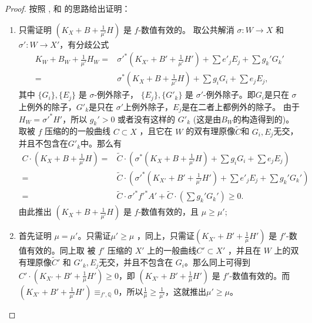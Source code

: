 \begin{proof}
  按照 \citet[Claim 13.20]{haconMinimalModelProgram2012}, \citet[Theorem 5.1]{liuSarkisovProgramGeneralized2021} 和 \citet[Theorem 4.2]{cortiFactoringBirationalMaps}的思路给出证明：
  \begin{enumerate}
    \item 只需证明 $ (K_X+B+\frac{1}{\mu'}H) $ 是 $ f $-数值有效的。 取公共解消 $\sigma:W\to X$ 和 $\sigma':W\to X'$，有分歧公式
          \[ \begin{aligned}
              K_W+B_W+\frac{1}{\mu'}H_W= & \sigma'^*(K_{X'}+B'+\frac{1}{\mu'}H')+\sum e'_jE_j+ \sum g_k'G_k' \\
              =                          & \sigma^*(K_{X}+B+\frac{1}{\mu'}H)+\sum g_iG_i+\sum e_jE_j,
            \end{aligned} \]
          其中 $ \{G_i\}, \{E_j\} $ 是 $ \sigma $-例外除子，  $ \{E_j\}, \{G'_k\} $ 是 $ \sigma' $-例外除子。即$ G_{i}$是只在 $\sigma$上例外的除子，$ G'_{k}$是只在 $\sigma'$上例外除子，$E_{j}$是在二者上都例外的除子。 由于  $H_W=\sigma'^*H' $，所以 $ g_k'>0 $ 或者没有这样的 $ G'_k $ (这是由$B_{W}$的构造得到的)。取被 $f$ 压缩的的一般曲线 $ C\subset X $ ，且它在 $W$ 的双有理原像$ \tilde{C} $和 $ G_i, E_j $无交，并且不包含在$ G'_k $中。那么有
          \[ \begin{aligned}
              C\cdot\left(K_X+B+\frac{1}{\mu'}H\right)= & \tilde{C}\cdot\left(\sigma^*\left(K_X+B+\frac{1}{\mu'}H\right)+\sum g_iG_i+\sum e_jE_j\right)           \\
              =                                     & \tilde{C}\cdot\left(\sigma'^*\left(K_{X'}+B'+\frac{1}{\mu'}H'\right)+\sum e'_jE_j+ \sum g_k'G_k'\right) \\
              =                                     & \tilde{C}\cdot\sigma'^*f'^*A'+\tilde{C}\cdot\left(\sum g_k'G_k'\right) \geqslant0 .
            \end{aligned} \]
          由此推出 $ (K_X+B+\frac{1}{\mu'}H) $ 是 $ f $-数值有效的，且 $ \mu\geqslant \mu' $;
    \item 首先证明 $ \mu=\mu' $。只需证$\mu'\geqslant \mu $ ，同上，只需证$ (K_{X'}+B'+\frac{1}{\mu}H') $ 是 $ f' $-数值有效的。同上取 被 $f'$ 压缩的 $X'$ 上的一般曲线$ C' \subset X'$ ，并且在 $W$ 上的双有理原像$\tilde{C}'$ 和  $ G'_k, E_j $无交，并且不包含在 $ G_i $。那么同上可得到$C'\cdot\left(K_{X'}+B'+\frac{1}{\mu}H'\right)\geqslant 0$，即 $ (K_{X'}+B'+\frac{1}{\mu}H') $ 是 $ f' $-数值有效的。而$ (K_{X'}+B'+\frac{1}{\mu'}H')\equiv_{f',\mathbb{Q}}0 $，所以$ \frac{1}{\mu}\geqslant \frac{1}{\mu'} $，这就推出$\mu'\geqslant \mu $。


\end{enumerate}
\end{proof}
